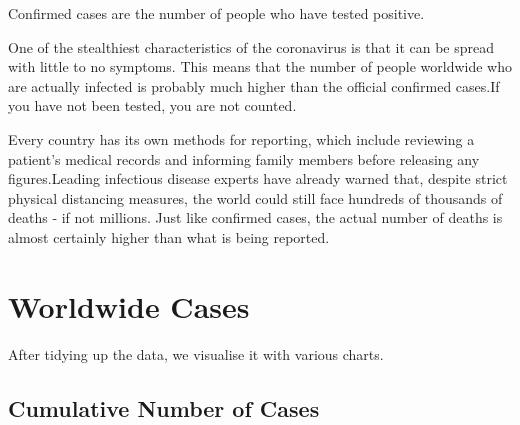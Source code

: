 Confirmed cases are the number of people who have tested positive.

One of the stealthiest characteristics of the coronavirus is that it can be spread with little to no symptoms. This means that the number of people worldwide who are actually infected is probably much higher than the official confirmed cases.If you have not been tested, you are not counted.

Every country has its own methods for reporting, which include reviewing a patient's medical records and informing family members before releasing any figures.Leading infectious disease experts have already warned that, despite strict physical distancing measures, the world could still face hundreds of thousands of deaths - if not millions.
Just like confirmed cases, the actual number of deaths is almost certainly higher than what is being reported.

\section{Worldwide Cases}
After tidying up the data, we visualise it with various charts.

\subsection{Cumulative Number of Cases}

